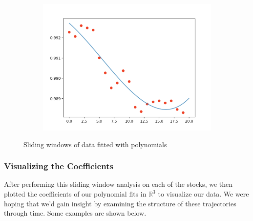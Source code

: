 \documentclass[final]{article}
\begin{document}
\begin{figure}[H]
\begin{subfigure}{.3\textwidth}
    \includegraphics[width=\linewidth]{img/sliding3}
  \end{subfigure}
  \caption{Sliding windows of data fitted with polynomials}
  \label{fig:sliding}
\end{figure}


\subsubsection{Visualizing the Coefficients}

After performing this sliding window analysis on each of the stocks,
we then plotted the coefficients of our polynomial fits in
$\mathbb{R}^3$ to visualize our data. We were hoping that we'd gain
insight by examining the structure of these trajectories through time.
Some examples are shown below.
\end{document}
